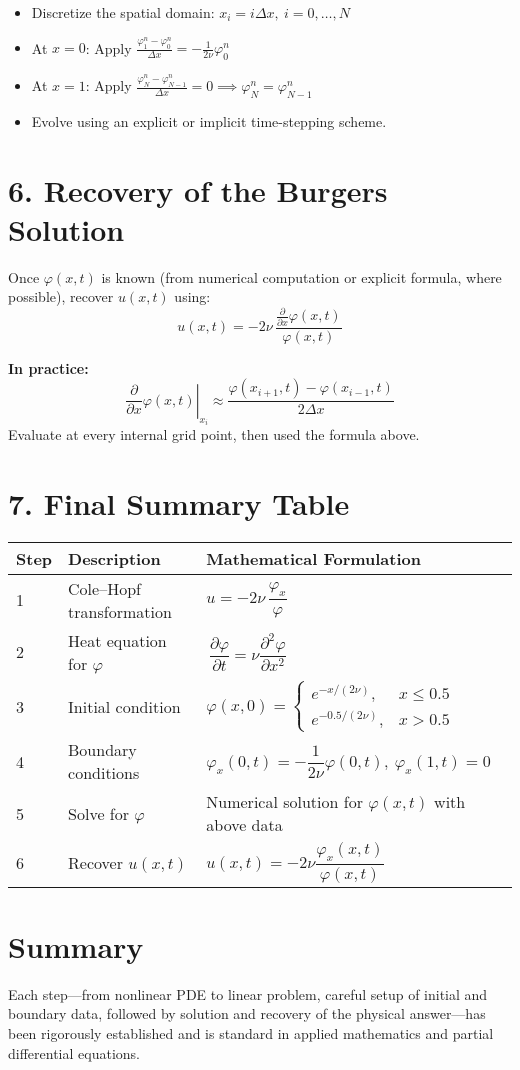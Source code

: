 \documentclass[12pt]{article}
\begin{document}
\begin{itemize}
    \item Discretize the spatial domain: $x_i = i \Delta x,~i=0,\dots,N$
    \item At $x=0$: Apply $ \displaystyle \frac{\varphi_1^n - \varphi_0^n}{\Delta x} = -\frac{1}{2\nu} \varphi_0^n $
    \item At $x=1$: Apply $ \displaystyle \frac{\varphi_N^n - \varphi_{N-1}^n}{\Delta x} = 0 \implies \varphi_N^n = \varphi_{N-1}^n $
    \item Evolve using an explicit or implicit time-stepping scheme.
\end{itemize}

\section*{6. Recovery of the Burgers Solution}

Once $\varphi(x, t)$ is known (from numerical computation or explicit formula, where possible), recover $u(x, t)$ using:
\[
\boxed{
u(x, t) = -2\nu\, \frac{\frac{\partial}{\partial x} \varphi(x, t)}{\varphi(x, t)}
}
\]

\textbf{In practice:}
\[
\left. \frac{\partial}{\partial x} \varphi(x, t) \right|_{x_i} \approx \frac{\varphi(x_{i+1}, t) - \varphi(x_{i-1}, t)}{2\Delta x}
\]
Evaluate at every internal grid point, then used the formula above.

\section*{7. Final Summary Table}

\begin{center}
\renewcommand{\arraystretch}{1.25}
\begin{tabular}{|l|l|l|}
\hline
\textbf{Step} & \textbf{Description} & \textbf{Mathematical Formulation} \\
\hline
1 & Cole--Hopf transformation & $u = -2\nu\, \dfrac{\varphi_x}{\varphi}$ \\
2 & Heat equation for $\varphi$ & $\,\dfrac{\partial \varphi}{\partial t} = \nu \dfrac{\partial^2 \varphi}{\partial x^2}$ \\
3 & Initial condition & $\varphi(x,0) = \begin{cases} e^{-x/(2\nu)}, & x \leq 0.5 \\ e^{-0.5/(2\nu)}, & x > 0.5 \end{cases}$ \\
4 & Boundary conditions & $\varphi_x(0, t) = -\dfrac{1}{2\nu} \varphi(0, t),~\varphi_x(1, t) = 0$ \\
5 & Solve for $\varphi$ & Numerical solution for $\varphi(x, t)$ with above data \\
6 & Recover $u(x, t)$ & $u(x, t) = -2\nu \dfrac{\varphi_x(x, t)}{\varphi(x, t)}$ \\
\hline
\end{tabular}
\end{center}


\section*{Summary}

Each step---from nonlinear PDE to linear problem, careful setup of initial and boundary data, followed by solution and recovery of the physical answer---has been rigorously established and is standard in applied mathematics and partial differential equations.
\end{document}
